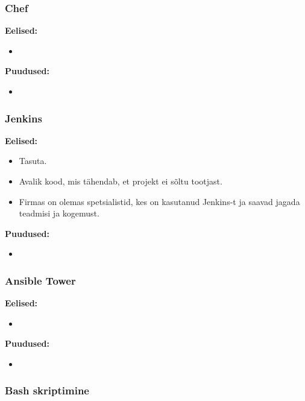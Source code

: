 \documentclass[12pt]{report}
\begin{document}
  \subsubsection{Chef}
  
  \textbf{Eelised:}
  \begin{itemize}
    \item 
  \end{itemize}
  
  \textbf{Puudused:}
  \begin{itemize}
    \item 
  \end{itemize}
  
  \subsubsection{Jenkins}
  
  \textbf{Eelised:}
  \begin{itemize}
    \item Tasuta.
    \item Avalik kood, mis tähendab, et projekt ei sõltu tootjast.
    \item Firmas on olemas spetsialistid, kes on kasutanud Jenkins-t ja saavad jagada teadmisi ja kogemust.
  \end{itemize}
  
  \textbf{Puudused:}
  \begin{itemize}
    \item 
  \end{itemize}
  
  \subsubsection{Ansible Tower}
  
  \textbf{Eelised:}
  \begin{itemize}
    \item 
  \end{itemize}
  
  \textbf{Puudused:}
  \begin{itemize}
    \item
  \end{itemize}

  \subsubsection{Bash skriptimine \cite{bash}}
  
\end{document}
